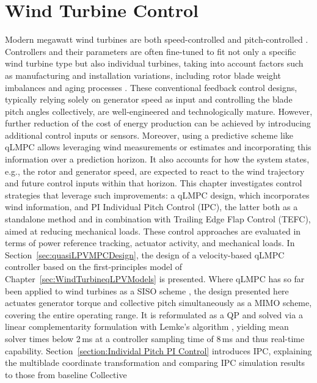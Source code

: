 \chapter{Wind Turbine Control}  \label{sec:Application to Wind Turbine Control4} 
Modern megawatt wind turbines are both speed-controlled and pitch-controlled \cite{pao2011control,mulders2018delft, elkodama2023control}. Controllers and their parameters are often fine-tuned to
fit not only a specific wind turbine type but also individual turbines, taking into account factors
such as manufacturing and installation variations, including rotor blade weight imbalances and
aging processes \cite{en14238083}. These conventional feedback control designs, typically relying
solely on generator speed as input and controlling the blade pitch angles collectively, are
well-engineered and technologically mature. However, further reduction of the cost of energy
production can be achieved by introducing additional control inputs or sensors. Moreover, using a
predictive scheme like qLMPC allows leveraging wind measurements or estimates and incorporating
this information over a prediction horizon. It also accounts for how the system states, e.g., the
rotor and generator speed, are expected to react to the wind trajectory and future control inputs
within that horizon. This chapter investigates control strategies that leverage such improvements:
a qLMPC design, which incorporates wind information, and PI Individual Pitch Control
(IPC), the latter both as a standalone method and in combination with Trailing Edge Flap Control
(TEFC), aimed at reducing mechanical loads. These control approaches are evaluated in terms of
power reference tracking, actuator activity, and mechanical loads.
%
In Section~\ref{sec:quasiLPVMPCDesign}, the design of a velocity-based qLMPC controller based on
the first-principles model of Chapter~\ref{sec:WindTurbineqLPVModels} is presented. Where qLMPC
has so far been applied to wind turbines as a SISO scheme \cite{mulders2020preventing, pamososuryo2022individual,
    fonseca2024windTurbineSideSide}, the design presented here actuates generator torque and
collective pitch simultaneously as a MIMO scheme, covering the entire operating range. It is
reformulated as a QP and solved via a linear complementarity formulation with Lemke's algorithm
\cite{cisneros2020velocity}, yielding mean solver times below 2\,ms at a controller sampling time
of 8\,ms and thus real-time capability.
%
Section~\ref{section:Individal Pitch PI Control} introduces IPC, explaining the multiblade
coordinate transformation and comparing IPC simulation results to those from baseline Collective
